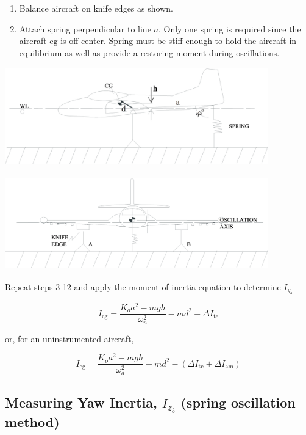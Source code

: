 \documentclass[
]{book}
\providecommand{\tightlist}{%
  \setlength{\itemsep}{0pt}\setlength{\parskip}{0pt}}
\begin{document}
\begin{enumerate}
\def\labelenumi{\arabic{enumi}.}
\tightlist
\item
  Balance aircraft on knife edges as shown.
\item
  Attach spring perpendicular to line \(a\). Only one spring is required since the aircraft \(\mathrm{cg}\) is off-center. Spring must be stiff enough to hold the aircraft in equilibrium as well as provide a restoring moment during oscillations.
\end{enumerate}

\includegraphics[width=4.5in,height=1.66667in]{media/07/image32.svg}

\includegraphics[width=4.5in,height=1.58333in]{media/07/image33.svg}

Repeat steps 3-12 and apply the moment of inertia equation to determine \(I_{y_b}\)

\[ I_{\mathrm{cg}} = \frac{K_o a^2 - mgh}{\omega_n^2} - md^2 - \Delta I_{\mathrm{te}} \]

or, for an uninstrumented aircraft,

\[ I_{\mathrm{cg}} = \frac{K_o a^2 - mgh}{\omega_d^2} - md^2 - \left(\Delta I_{\mathrm{te}} + \Delta I_{\mathrm{am}} \right) \]

\hypertarget{measuring-yaw-inertia-i_z_b-spring-oscillation-method}{%
\subsection{\texorpdfstring{Measuring Yaw Inertia, \(I_{z_b}\) (spring oscillation method)}{Measuring Yaw Inertia, I\_\{z\_b\} (spring oscillation method)}}\label{measuring-yaw-inertia-i_z_b-spring-oscillation-method}}
\end{document}

